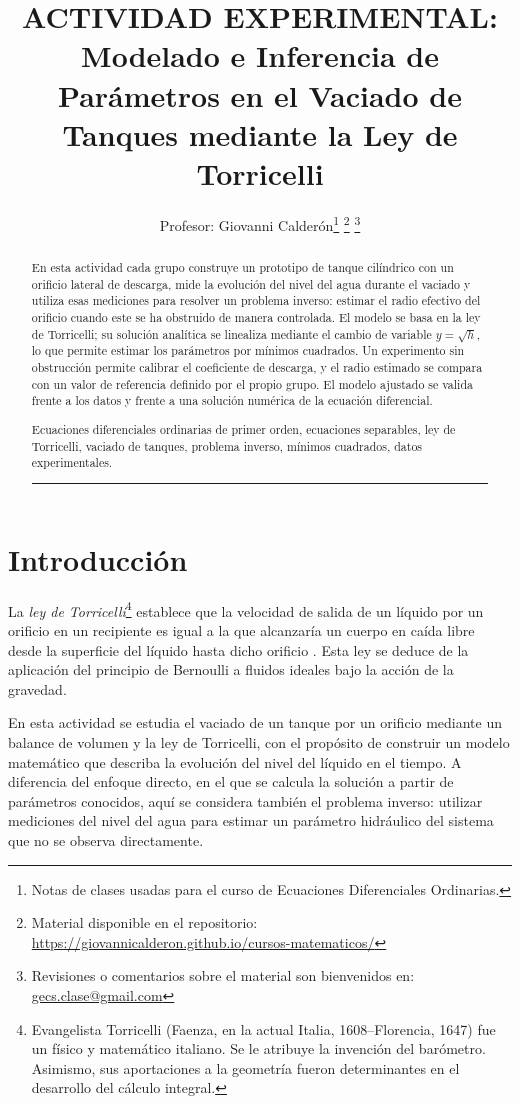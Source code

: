 \documentclass[oneside,letter,spanish,activeacute,english,links,10pt]{amcaGCS_EDO}
\title{ACTIVIDAD EXPERIMENTAL: Modelado e Inferencia de Parámetros en el Vaciado de Tanques mediante la Ley de Torricelli}
\author[a]{Profesor: Giovanni Calderón\thanks{Notas de clases usadas para el curso de Ecuaciones Diferenciales Ordinarias.}
	\thanks{Material disponible en el repositorio: \url{https://giovannicalderon.github.io/cursos-matematicos/}}
	\thanks{Revisiones o comentarios sobre el material son bienvenidos en: \url{gecs.clase@gmail.com}}}
\begin{document}
	
\maketitle
\noindent\hrulefill
\renewcommand{\abstractname}{Resumen}	

	\begin{abstract}
		En esta actividad cada grupo construye un prototipo de tanque cilíndrico con un orificio lateral de descarga, mide la evolución del nivel del agua durante el vaciado y utiliza esas mediciones para resolver un problema inverso: estimar el radio efectivo del orificio cuando este se ha obstruido de manera controlada. El modelo se basa en la ley de Torricelli; su solución analítica se linealiza mediante el cambio de variable $y=\sqrt{h}$, lo que permite estimar los parámetros por mínimos cuadrados. Un experimento sin obstrucción permite calibrar el coeficiente de descarga, y el radio estimado se compara con un valor de referencia definido por el propio grupo. El modelo ajustado se valida frente a los datos y frente a una solución numérica de la ecuación diferencial.
		
		\bigskip{}
		Ecuaciones diferenciales ordinarias de primer orden, ecuaciones separables, ley de Torricelli, vaciado de tanques, problema inverso, mínimos cuadrados, datos experimentales.
		\\\noindent\rule[2mm]{16cm}{1pt}
	\end{abstract}
	
	\vspace{.6cm}
	\ifdefined\decimalpoint\decimalpoint\fi
	
	\section{Introducción}
	La {\it ley de Torricelli}\footnote{Evangelista Torricelli (Faenza, en la actual Italia, 1608--Florencia, 1647) fue un físico y matemático italiano. Se le atribuye la invención del barómetro. Asimismo, sus aportaciones a la geometría fueron determinantes en el desarrollo del cálculo integral.} establece que la velocidad de salida de un líquido por un orificio en un recipiente es igual a la que alcanzaría un cuerpo en caída libre desde la superficie del líquido hasta dicho orificio \cite{Boyce, Zill1, Zill2, FoxMcDonald2015}. Esta ley se deduce de la aplicación del principio de Bernoulli a fluidos ideales bajo la acción de la gravedad.
	
	En esta actividad se estudia el vaciado de un tanque por un orificio mediante un balance de volumen y la ley de Torricelli, con el propósito de construir un modelo matemático que describa la evolución del nivel del líquido en el tiempo. A diferencia del enfoque directo, en el que se calcula la solución a partir de parámetros conocidos, aquí se considera también el problema inverso: utilizar mediciones del nivel del agua para estimar un parámetro hidráulico del sistema que no se observa directamente.
	
\end{document}
